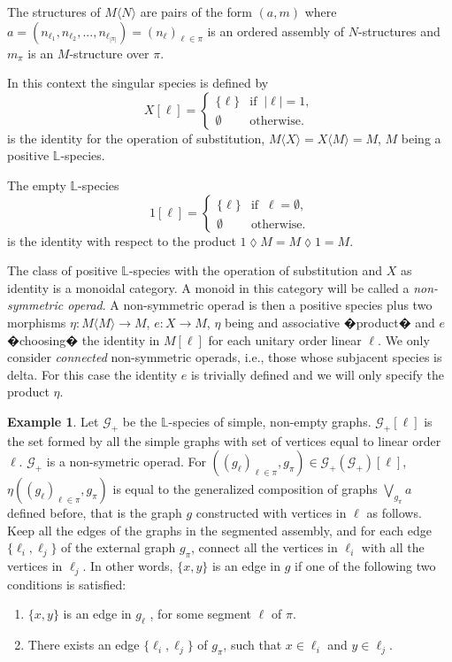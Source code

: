 \documentclass[11pt]{article}
\theoremstyle{definition}
\newtheorem{example}[theorem]{Example}
\begin{document}
The structures of $M\langle N \rangle$ are pairs of the form $(a,m)$ where $a=(n_{\ell_1} ,n_{\ell_2}, . . ., n_{\ell_{|\pi|}})=(n_{\ell})_{\ell\in \pi}$ is an ordered
assembly of $N$-structures and $m_{\pi}$ is an $M$-structure over $\pi$.

In this context the singular species is defined by
\[X[\ell]=\left\{\begin{array}{cc}
    \{\ell\} &\mbox{if}\;\;|\ell|=1,  \\
    \emptyset & \mbox{otherwise.}
\end{array}\right.
\]
is the identity for the operation of substitution, $M\langle X \rangle = X \langle M \rangle = M$, $M$ being a positive $\mathbb{L}$-species.

The empty $\mathbb{L}$-species
\[1[\ell]=\left\{\begin{array}{cc}
    \{\ell\} &\mbox{if}\;\;\ell=\emptyset,  \\
    \emptyset & \mbox{otherwise.}
\end{array}\right.
\]
is the identity with respect to the product $1\lozenge M = M \lozenge 1 = M$.

The class of positive $\mathbb{L}$-species with the operation of substitution and $X$ as identity is a monoidal
category. A monoid in this category will be called a \emph{non-symmetric operad}.
A non-symmetric operad is then a positive species plus two morphisms $\eta: M\langle M\rangle\longrightarrow M$, $e: X \longrightarrow M$, $\eta$ being
and associative �product� and $e$ �choosing� the identity in $M[\ell]$ for each unitary order linear $\ell$. We only consider \emph{connected} non-symmetric operads, i.e., those whose subjacent species is delta. For this case the
identity $e$ is trivially defined and we will only specify the product $\eta$.

\begin{example}\label{Join operad}  Let $\mathscr{G_+}$ be the $\mathbb{L}$-species of simple, non-empty graphs. $\mathscr{G_+}[\ell]$ is the set formed by all the simple graphs with set of vertices equal to linear order $\ell$. $\mathscr{G_+}$ is a non-symetric operad. For $((g_{\ell})_{{\ell}\in \pi}, g_{\pi})\in \mathscr{G_+}(\mathscr{G_+})[\ell]$, $\eta((g_{\ell})_{{\ell}\in \pi}, g_{\pi})$ is equal to the generalized composition of graphs $\displaystyle{\bigvee_{g_{\pi}} \mathit{a}}$
defined before, that is the graph $g$ constructed with vertices in $\ell$ as follows. Keep all the edges of the graphs in the segmented assembly, and for each edge $\{\ell_i, \ell_j\}$ of the external graph $g_{\pi}$, connect all the vertices in $\ell_i$ with all the vertices in $\ell_j$. In other words, $\{x, y\}$ is an edge in $g$ if one of the following two conditions is satisfied:
\begin{enumerate}
    \item $\{x, y\}$ is an edge in $g_{\ell}$ , for some segment $\ell$ of $\pi$.
    \item There exists an edge $\{\ell_i, \ell_j\}$ of $g_{\pi}$, such that $x\in \ell_i$ and $y\in \ell_j$.
\end{enumerate}
\end{example}
\end{document}

